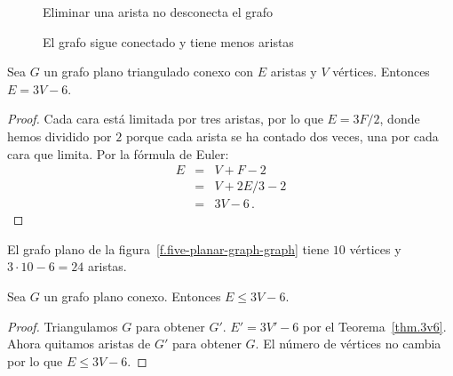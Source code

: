 \begin{figure}[ht]
\begin{minipage}{.45\textwidth}
\begin{center}
\caption{Eliminar una arista no desconecta el grafo}\label{f.five-connected-remains}
\end{center}
\end{minipage}
\hfill
\begin{minipage}{.45\textwidth}
\begin{center}
\caption{El grafo sigue conectado y tiene menos aristas}\label{f.five-connected-fewer}
\end{center}
\end{minipage}
\end{figure}

\begin{theorem}\label{thm.3v6}
Sea $G$ un grafo plano triangulado conexo con $E$ aristas y $V$ vértices. Entonces $E= 3V-6$.
\end{theorem}
\begin{proof}
Cada cara está limitada por tres aristas, por lo que $E=3F/2$, donde hemos dividido por $2$ porque cada arista se ha contado dos veces, una por cada cara que limita. Por la fórmula de Euler:
\begin{eqnarray*}
E&=&V+F-2\\
&=&V+2E/3-2\\
&=&3V-6\,.
\end{eqnarray*}
\end{proof}

\begin{example}
El grafo plano de la figura~\ref{f.five-planar-graph-graph} tiene $10$ vértices y $3\cdot 10-6=24$ aristas.
\end{example}

\begin{theorem}\label{thm.count}
Sea $G$ un grafo plano conexo. Entonces $E\leq 3V-6$.
\end{theorem}

\begin{proof}
Triangulamos $G$ para obtener $G'$. $E'= 3V'-6$ por el Teorema~\ref{thm.3v6}. Ahora quitamos aristas de $G'$ para obtener $G$. El número de vértices no cambia por lo que $E\leq 3V-6$.
\end{proof}

